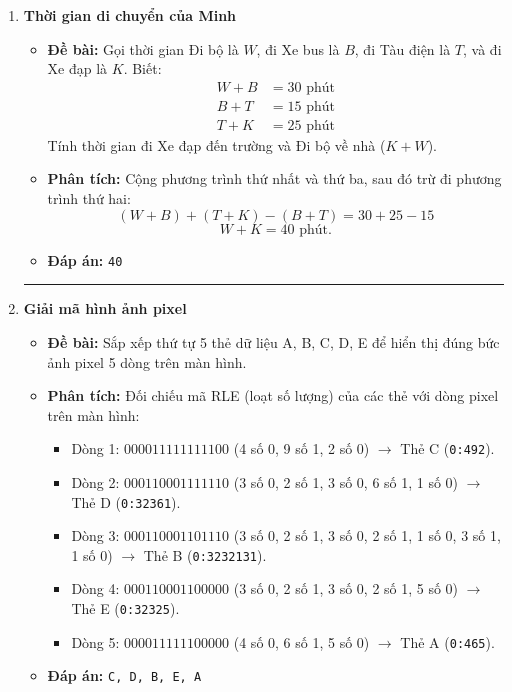 \documentclass[11pt,a4paper]{article}
\begin{document}
\begin{enumerate}[label=\textbf{Câu \arabic*:}, leftmargin=*]
\hrule
\vspace{0.5cm}

\item \textbf{Thời gian di chuyển của Minh}
    \begin{itemize}
        \item \textbf{Đề bài:} Gọi thời gian Đi bộ là $W$, đi Xe bus là $B$, đi Tàu điện là $T$, và đi Xe đạp là $K$. Biết:
            \begin{align*}
                W + B &= 30\text{ phút} \\
                B + T &= 15\text{ phút} \\
                T + K &= 25\text{ phút}
            \end{align*}
            Tính thời gian đi Xe đạp đến trường và Đi bộ về nhà ($K + W$).
        \item \textbf{Phân tích:}
            Cộng phương trình thứ nhất và thứ ba, sau đó trừ đi phương trình thứ hai:
            $$(W + B) + (T + K) - (B + T) = 30 + 25 - 15$$
            $$W + K = 40\text{ phút}.$$
        \item \textbf{Đáp án:} \texttt{40}
    \end{itemize}

\hrule
\vspace{0.5cm}

\item \textbf{Giải mã hình ảnh pixel}
    \begin{itemize}
        \item \textbf{Đề bài:} Sắp xếp thứ tự 5 thẻ dữ liệu A, B, C, D, E để hiển thị đúng bức ảnh pixel 5 dòng trên màn hình.
        \item \textbf{Phân tích:}
            Đối chiếu mã RLE (loạt số lượng) của các thẻ với dòng pixel trên màn hình:
            \begin{itemize}
                \item Dòng 1: $000011111111100$ (4 số 0, 9 số 1, 2 số 0) $\to$ Thẻ C (\texttt{0:492}).
                \item Dòng 2: $000110001111110$ (3 số 0, 2 số 1, 3 số 0, 6 số 1, 1 số 0) $\to$ Thẻ D (\texttt{0:32361}).
                \item Dòng 3: $000110001101110$ (3 số 0, 2 số 1, 3 số 0, 2 số 1, 1 số 0, 3 số 1, 1 số 0) $\to$ Thẻ B (\texttt{0:3232131}).
                \item Dòng 4: $000110001100000$ (3 số 0, 2 số 1, 3 số 0, 2 số 1, 5 số 0) $\to$ Thẻ E (\texttt{0:32325}).
                \item Dòng 5: $000011111100000$ (4 số 0, 6 số 1, 5 số 0) $\to$ Thẻ A (\texttt{0:465}).
            \end{itemize}
        \item \textbf{Đáp án:} \texttt{C, D, B, E, A}
    \end{itemize}


\end{enumerate}
\end{document}
